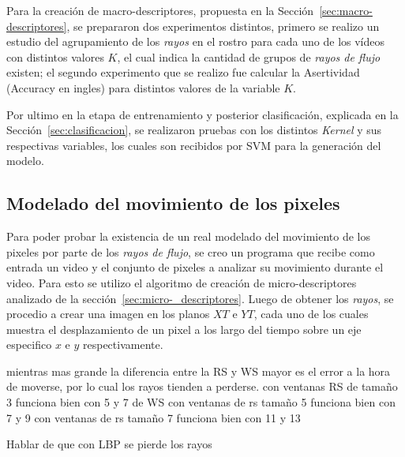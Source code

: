 Para la creación de macro-descriptores, propuesta en la Sección~\ref{sec:macro-descriptores}, se prepararon dos experimentos distintos, primero se realizo un estudio del agrupamiento de los \textit{rayos} en el rostro para cada uno de los vídeos con distintos valores $K$, el cual indica la cantidad de grupos de \textit{rayos de flujo} existen; el segundo experimento que se realizo fue calcular la Asertividad (Accuracy en ingles) para distintos valores de la variable $K$.

Por ultimo en la etapa de entrenamiento y posterior clasificación, explicada en la Sección~\ref{sec:clasificacion}, se realizaron pruebas con los distintos \textit{Kernel} y sus respectivas variables, los cuales son recibidos por SVM para la generación del modelo.


\subsection{}


\subsection{Modelado del movimiento de los pixeles}
\label{exp:rayos}
Para poder probar la existencia de un real modelado del movimiento de los pixeles por parte de los \textit{rayos de flujo}, se creo un programa que recibe como entrada un video y el conjunto de pixeles a analizar su movimiento durante el video. Para esto se utilizo el algoritmo de creación de micro-descriptores analizado de la sección~\ref{sec:micro-_descriptores}. Luego de obtener los \textit{rayos}, se procedio a crear una imagen en los planos $XT$ e $YT$, cada uno de los cuales muestra el desplazamiento de un pixel a los largo del tiempo sobre un eje especifico $x$ e $y$ respectivamente.  

mientras mas grande la diferencia entre la RS y WS mayor es el error a la hora de moverse, por lo cual los rayos tienden a perderse.
con ventanas RS de tamaño 3 funciona bien con 5 y 7 de WS
con ventanas de rs tamaño 5 funciona bien con 7 y 9
con ventanas de rs tamaño 7 funciona bien con 11 y 13

Hablar de que con LBP se pierde los rayos

